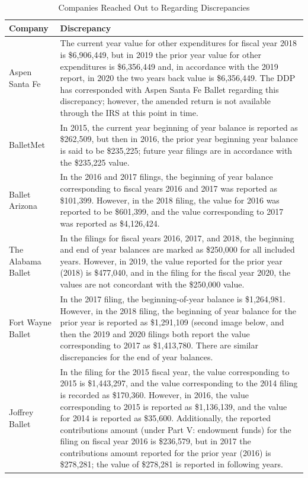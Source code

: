 \documentclass[Dance Data
Project,article,submit,moreauthors,pdftex]{mdpi}
\begin{document}
\begin{table}[H]

\caption{\label{tab:unnamed-chunk-1}\label{table:discrep}Companies Reached Out to Regarding Discrepancies}
\centering
\begin{tabular}[t]{l>{\raggedright\arraybackslash}p{35em}}
\toprule
Company & Discrepancy\\
\midrule
Aspen Santa Fe & The current year value for other expenditures for fiscal year 2018 is \$6,906,449, but in 2019 the prior year value for other expenditures is \$6,356,449 and, in accordance with the 2019 report, in 2020 the two years back value is \$6,356,449. The DDP has corresponded with Aspen Santa Fe Ballet regarding this discrepancy; however, the amended return is not available through the IRS at this point in time.\\
\addlinespace
BalletMet & In 2015, the current year beginning of year balance is reported as \$262,509, but then in 2016, the prior year beginning year balance is said to be \$235,225; future year filings are in accordance with the \$235,225 value.\\
\addlinespace
Ballet Arizona & In the 2016 and 2017 filings, the beginning of year balance corresponding to fiscal years 2016 and 2017 was reported as \$101,399. However, in the 2018 filing, the value for 2016 was reported to be \$601,399, and the value corresponding to 2017 was reported as \$4,126,424.\\
\addlinespace
The Alabama Ballet & In the filings for fiscal years 2016, 2017, and 2018,  the beginning and end of year balances are marked as \$250,000 for all included years. However, in 2019, the value reported for the prior year (2018)  is \$477,040, and in the filing for the fiscal year 2020, the values are not concordant with the \$250,000 value.\\
\addlinespace
Fort Wayne Ballet & In the 2017 filing, the beginning-of-year balance is \$1,264,981. However, in the 2018 filing, the beginning of year balance for the prior year is reported as \$1,291,109 (second image below, and then the 2019 and 2020 filings both report the value corresponding to 2017 as \$1,413,780. There are similar discrepancies for the end of year balances.\\
\addlinespace
Joffrey Ballet & In the filing for the 2015 fiscal year, the value corresponding to 2015 is \$1,443,297, and the value corresponding to the 2014 filing is recorded as \$170,360.  However, in 2016, the value corresponding to 2015 is reported as \$1,136,139, and the value for 2014 is reported as \$35,600. Additionally, the reported contributions amount (under Part V: endowment funds)  for the filing on fiscal year 2016 is \$236,579, but in 2017 the contributions amount reported for the prior year (2016) is \$278,281; the value of \$278,281 is reported in following years.\\

\end{tabular}
\end{table}
\end{document}
